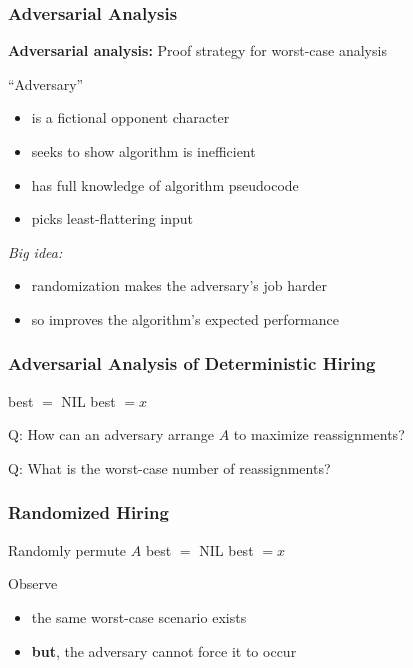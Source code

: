 \documentclass[10pt]{beamer}
\begin{document}
\begin{frame} \frametitle{Adversarial Analysis}
  \textbf{Adversarial analysis:} Proof strategy for worst-case analysis
  \vspace{12pt}

  ``Adversary''
  \begin{itemize}
    \item is a fictional opponent character
    \item seeks to show algorithm is inefficient
    \item has full knowledge of algorithm pseudocode
    \item picks least-flattering input
  \end{itemize}
  \vspace{12pt}

  \emph{Big idea:}
  \begin{itemize}
    \item randomization makes the adversary's job harder
    \item so improves the algorithm's expected performance
  \end{itemize}
\end{frame}

\begin{frame} \frametitle{Adversarial Analysis of Deterministic Hiring}
  {\footnotesize
  \begin{algorithmic}[1]
    \State best $ = $ NIL
        \State best $= x$
      \EndIf
    \EndFor
    \State {}
    \EndFunction
  \end{algorithmic}
  }
  \vspace{12pt}

  Q: How can an adversary arrange $A$ to maximize reassignments?
  \vspace{12pt}

  Q: What is the worst-case number of reassignments?
\end{frame}

\begin{frame} \frametitle{Randomized Hiring}
  {\footnotesize
  \begin{algorithmic}[1]
    \State Randomly permute $A$ 
    \State best $ = $ NIL
        \State best $= x$
      \EndIf
    \EndFor
    \State {}
    \EndFunction
  \end{algorithmic}
  }
  \vspace{12pt}

  Observe
  \begin{itemize}
    \item the same worst-case scenario exists
    \item \textbf{but}, the adversary cannot force it to occur
  \end{itemize}
\end{frame}
\end{document}

